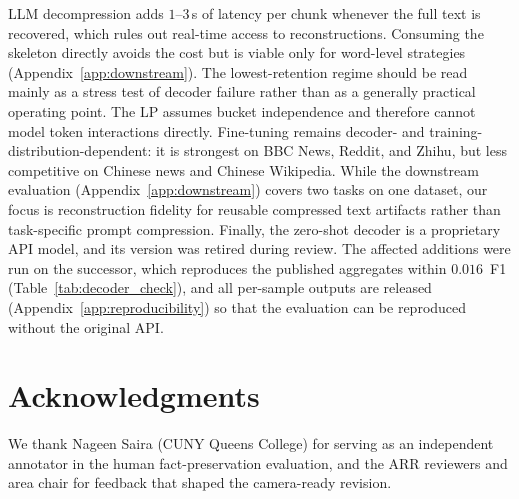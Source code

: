 \documentclass[11pt]{article}
\begin{document}
LLM decompression adds $1$--$3$\,s of latency per chunk whenever the full text is recovered, which rules out
real-time access to reconstructions. Consuming the skeleton directly avoids the cost but is viable only for
word-level strategies (Appendix~\ref{app:downstream}). The
lowest-retention regime should be read mainly as a stress test of decoder failure rather than as a
generally practical operating point. The LP assumes bucket independence and therefore cannot model
token interactions directly. Fine-tuning remains decoder- and training-distribution-dependent:
it is strongest on BBC News, Reddit, and Zhihu, but less competitive on Chinese news and Chinese
Wikipedia. While the downstream evaluation (Appendix~\ref{app:downstream}) covers two tasks on
one dataset, our focus is reconstruction fidelity for reusable compressed text artifacts rather than
task-specific prompt compression. Finally, the zero-shot decoder is a proprietary API model, and its version was retired during review. The affected additions were run on the successor, which reproduces the published aggregates within $0.016$~F1 (Table~\ref{tab:decoder_check}), and all per-sample outputs are released (Appendix~\ref{app:reproducibility}) so that the evaluation can be reproduced without the original API.

\section*{Acknowledgments}

We thank Nageen Saira (CUNY Queens College) for serving as an independent annotator in the
human fact-preservation evaluation, and the ARR reviewers and area chair for feedback that
shaped the camera-ready revision.
\end{document}
